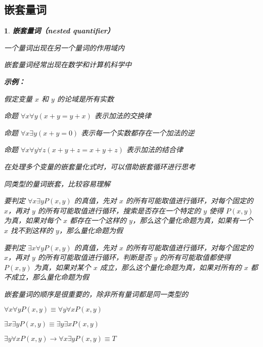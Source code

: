 \documentclass[UTF8]{report}
\theoremstyle{MyLineTheoremStyle} %
\theoremstyle{MyBlockTheoremStyle} %
\theoremstyle{MySubsubsectionStyle} %
\newtheorem{definition}{}
\begin{document}
\subsection{嵌套量词}

\begin{definition}
    \textbf{嵌套量词（nested quantifier）}\par
    一个量词出现在另一个量词的作用域内\par
    嵌套量词经常出现在数学和计算机科学中\par
    \vspace{1em} %
    \textbf{示例：}\par
    假定变量 $x$ 和 $y$ 的论域是所有实数\par
    命题 $\forall x \forall y (x + y = y + x)$ 表示加法的交换律\par
    命题 $\forall x \exists y (x + y = 0)$ 表示每一个实数都存在一个加法的逆\par
    命题 $\forall x \forall y \forall z (x + y + z = x + y + z)$ 表示加法的结合律\par
    \vspace{1em} %
    在处理多个变量的嵌套量化式时，可以借助嵌套循环进行思考\par
    同类型的量词嵌套，比较容易理解\par
    要判定 $\forall x \exists y P(x, y)$ 的真值，先对 $x$ 的所有可能取值进行循环，对每个固定的 $x$，再对 $y$ 的所有可能取值进行循环，搜索是否存在一个特定的 $y$ 使得 $P(x, y)$ 为真，如果对每个 $x$ 都存在一个这样的 $y$，那么这个量化命题为真，如果有一个 $x$ 找不到这样的 $y$，那么量化命题为假\par
    要判定 $\exists x \forall y P(x, y)$ 的真值，先对 $x$ 的所有可能取值进行循环，对每个固定的 $x$，再对 $y$ 的所有可能取值进行循环，判断是否 $y$ 的所有可能取值都使得 $P(x, y)$ 为真，如果对某个 $x$ 成立，那么这个量化命题为真，如果对所有的 $x$ 都不成立，那么量化命题为假\par
    \vspace{1em} %
    嵌套量词的顺序是很重要的，除非所有量词都是同一类型的\par
    $\forall x \forall y P(x, y) \equiv \forall y \forall x P(x, y)$\par
    $\exists x \exists y P(x, y) \equiv \exists y \exists x P(x, y)$\par
    $\exists y \forall x P(x, y) \rightarrow \forall x \exists y P(x, y) \equiv T$\par
    \vspace{1em} %

\end{definition}
\end{document}
